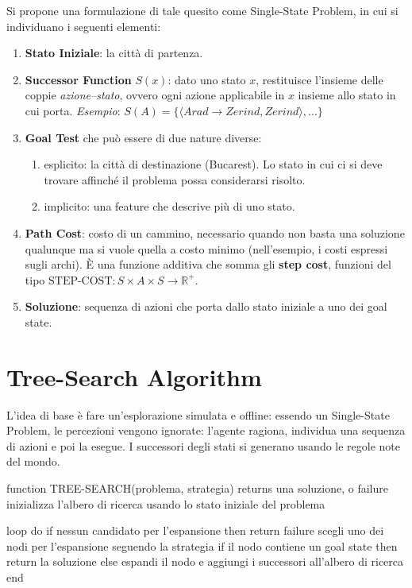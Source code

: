 \documentclass[a4paper, 11pt, oneside]{book}
\theoremstyle{definition}
\begin{document}
	Si propone una formulazione di tale quesito come Single-State Problem, in cui
	si individuano i seguenti elementi:
	\begin{enumerate}
		\item \textbf{Stato Iniziale}: la citt\`a di partenza.

		\item \textbf{Successor Function} $S(x)$: dato uno stato $x$, restituisce
			l'insieme delle coppie \emph{azione--stato}, ovvero ogni azione applicabile
			in $x$ insieme allo stato in cui porta.
			\emph{Esempio}: $S(A) = \{\langle Arad \rightarrow Zerind, Zerind \rangle, \hdots \}$

		\item \textbf{Goal Test} che pu\`o essere di due nature diverse:
			\begin{enumerate}
				\item esplicito: la citt\`a di destinazione (Bucarest). Lo stato in cui
					ci si deve trovare affinch\'e il problema possa considerarsi risolto.

				\item implicito: una feature che descrive pi\`u di uno stato.
			\end{enumerate}

		\item \textbf{Path Cost}: costo di un cammino, necessario quando non basta una
			soluzione qualunque ma si vuole quella a costo minimo (nell'esempio, i costi
			espressi sugli archi). \`E una funzione additiva che somma gli \textbf{step cost},
			funzioni del tipo $\text{STEP-COST}: S \times A \times S \rightarrow \mathbb{R}^+$.
		\item \textbf{Soluzione}: sequenza di azioni che porta dallo stato iniziale a
			uno dei goal state.
	\end{enumerate}

	\section{Tree-Search Algorithm}
	L'idea di base \`e fare un'esplorazione simulata e offline: essendo un Single-State
	Problem, le percezioni vengono ignorate: l'agente ragiona, individua una sequenza di
	azioni e poi la esegue. I successori degli stati si generano usando le regole note del
	mondo.

\begin{codice}
function TREE-SEARCH(problema, strategia) returns una soluzione, o failure
    inizializza l'albero di ricerca usando lo stato iniziale del problema

    loop do
        if nessun candidato per l'espansione then return failure
        scegli uno dei nodi per l'espansione seguendo la strategia
        if il nodo contiene un goal state then return la soluzione
        else espandi il nodo e aggiungi i successori all'albero di ricerca
    end
\end{codice}
\end{document}
